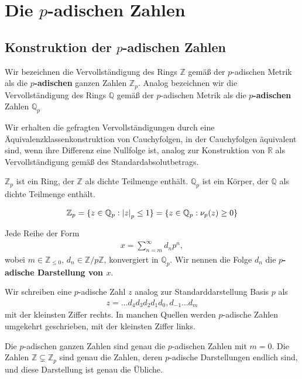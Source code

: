 \documentclass{report}
\newcommand*{\newpar}{\par\vspace{\baselineskip}\noindent}
\newcommand{\tbf}[1]{\textbf{#1}}
\newcommand{\bQ}{\mathbb{Q}}
\newcommand{\bR}{\mathbb{R}}
\newcommand{\bZ}{\mathbb{Z}}
\begin{document}
	\chapter{Die $p$-adischen Zahlen}
	\section{Konstruktion der $p$-adischen Zahlen}
	\begin{definition}
		Wir bezeichnen die Vervollständigung des Rings $\bZ$ gemäß der $p$-adischen Metrik als die \tbf{$p$-adischen} ganzen Zahlen $\bZ_p$. Analog bezeichnen wir die Vervollständigung des Rings $\bQ$ gemäß der $p$-adischen Metrik als die \tbf{$p$-adischen} Zahlen $\bQ_p$
	\end{definition}
	\noindent Wir erhalten die gefragten Vervollständigungen durch eine Äquivalenzklassenkonstruktion von Cauchyfolgen, in der Cauchyfolgen äquivalent sind, wenn ihre Differenz eine Nullfolge ist, analog zur Konstruktion von $\bR$ als Vervollständigung gemäß des Standardabsolutbetrags.
	\begin{proposition}
		$\bZ_p$ ist ein Ring, der $\bZ$ als dichte Teilmenge enthält. $\bQ_p$ ist ein Körper, der $\bQ$ als dichte Teilmenge enthält.
	\end{proposition}
	\begin{proposition}
		\begin{align*}
			\bZ_p = \{z \in \bQ_p : \abs{z}_p \leq 1\} = \{z \in \bQ_p : \nu_p(z) \geq 0\}
		\end{align*}
	\end{proposition}
	\begin{proposition}
		Jede Reihe der Form
		\begin{align*}
			x = \sum_{n = m}^\infty d_n p^n,
		\end{align*}
		wobei $m \in \bZ_{\leq 0}$, $d_n \in \bZ / p\bZ$, konvergiert in $\bQ_p$. Wir nennen die Folge $d_n$ die \tbf{$p$-adische Darstellung von $x$}.
	\end{proposition}
	\noindent Wir schreiben eine $p$-adische Zahl $z$ analog zur Standarddarstellung Basis $p$ als 
	\begin{align*}
		z = \hdots d_4 d_3 d_2 d_1 d_0, d_{-1} \hdots d_{m}
	\end{align*}
	mit der kleinsten Ziffer rechts. In manchen Quellen werden $p$-adische Zahlen umgekehrt geschrieben, mit der kleinsten Ziffer links.
	\newpar
	\noindent Die $p$-adischen ganzen Zahlen sind genau die $p$-adischen Zahlen mit $m = 0$. Die Zahlen $\bZ \subsetneq \bZ_p$ sind genau die Zahlen, deren $p$-adische Darstellungen endlich sind, und diese Darstellung ist genau die Übliche.
\end{document}
